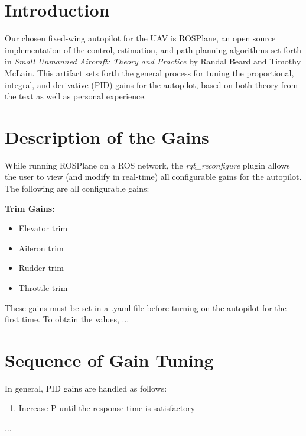 \documentclass[]{auvsi_doc}
\begin{document}
\begin{AUVSITitlePage}
\begin{artifacttable}
\end{artifacttable}
\end{AUVSITitlePage}

\section{Introduction}

Our chosen fixed-wing autopilot for the UAV is ROSPlane, an open source implementation of the control, estimation, and path planning algorithms set forth in \textit{Small Unmanned Aircraft: Theory and Practice} by Randal Beard and Timothy McLain. This artifact sets forth the general process for tuning the proportional, integral, and derivative (PID) gains for the autopilot, based on both theory from the text as well as personal experience.

\section{Description of the Gains}

While running ROSPlane on a ROS network, the \textit{rqt_reconfigure} plugin allows the user to view (and modify in real-time) all configurable gains for the autopilot. The following are all configurable gains:

\textbf{Trim Gains:}
\begin{itemize}
  \item Elevator trim
  \item Aileron trim
  \item Rudder trim
  \item Throttle trim
\end{itemize}

These gains must be set in a .yaml file before turning on the autopilot for the first time. To obtain the values, ...

\section{Sequence of Gain Tuning}

In general, PID gains are handled as follows:
\begin{enumerate}
  \item Increase P until the response time is satisfactory
\end{enumerate}

...
\end{document}
